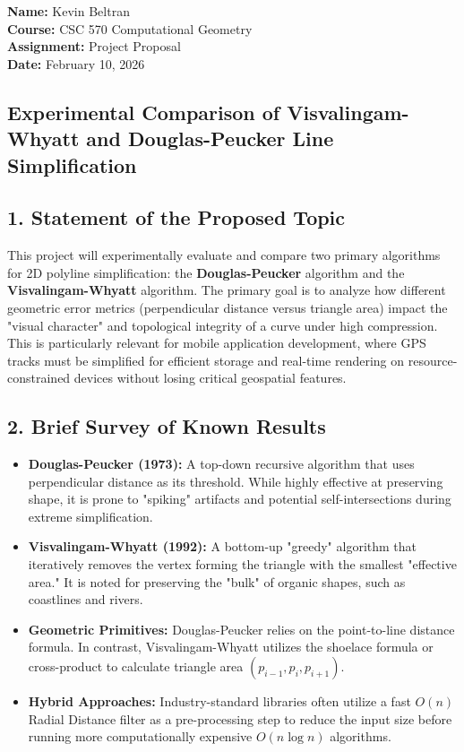 \documentclass[11pt]{article}
\begin{document}
\begin{flushleft}
\textbf{Name:} Kevin Beltran \\
\textbf{Course:} CSC 570 Computational Geometry \\
\textbf{Assignment:} Project Proposal \\
\textbf{Date:} February 10, 2026
\end{flushleft}

\begin{center}
    \section*{Experimental Comparison of Visvalingam-Whyatt and Douglas-Peucker Line Simplification}
\end{center}

\subsection*{1. Statement of the Proposed Topic}
This project will experimentally evaluate and compare two primary algorithms for 2D polyline simplification: the \textbf{Douglas-Peucker} algorithm and the \textbf{Visvalingam-Whyatt} algorithm. The primary goal is to analyze how different geometric error metrics (perpendicular distance versus triangle area) impact the "visual character" and topological integrity of a curve under high compression. This  is particularly relevant for mobile application development, where GPS tracks must be simplified for efficient storage and real-time rendering on resource-constrained devices without losing critical geospatial features.

\subsection*{2. Brief Survey of Known Results}
\begin{itemize}
    \item \textbf{Douglas-Peucker (1973):} A top-down recursive algorithm that uses perpendicular distance as its threshold. While highly effective at preserving shape, it is prone to "spiking" artifacts and potential self-intersections during extreme simplification.
    \item \textbf{Visvalingam-Whyatt (1992):} A bottom-up "greedy" algorithm that iteratively removes the vertex forming the triangle with the smallest "effective area." It is noted for preserving the "bulk" of organic shapes, such as coastlines and rivers.
    \item \textbf{Geometric Primitives:} Douglas-Peucker relies on the point-to-line distance formula. In contrast, Visvalingam-Whyatt utilizes the shoelace formula or cross-product to calculate triangle area $(p_{i-1}, p_i, p_{i+1})$.
    \item \textbf{Hybrid Approaches:} Industry-standard libraries often utilize a fast $O(n)$ Radial Distance filter as a pre-processing step to reduce the input size before running more computationally expensive $O(n \log n)$ algorithms.
\end{itemize}
\end{document}
